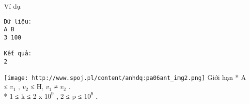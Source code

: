 Ví dụ  
\begin{verbatim}
Dữ liệu:
A B
3 100

Kết quả:
2
\end{verbatim}


\texttt{[image: http://www.spoj.pl/content/anhdq:pa06ant\_img2.png]}
   Giới hạn  
* A ≤ $v_{1}$   , $v_{2}$   ≤ H, $v_{1}$   ≠ $v_{2}$   .   
\\   * 1 ≤ k ≤ 2 x $10^{9}$   , 2 ≤ p ≤ $10^{9}$   .   
\\